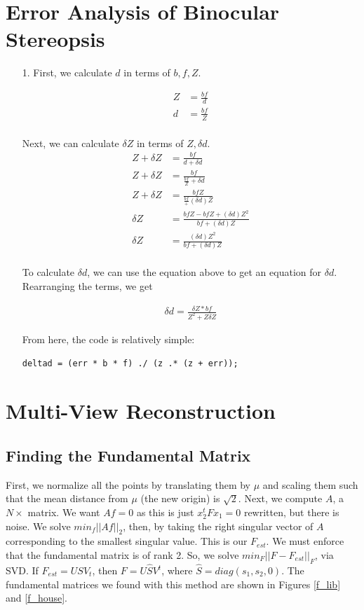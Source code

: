 \documentclass[11pt]{article}
\begin{document}
\newpage
\section{Error Analysis of Binocular Stereopsis}
\begin{enumerate}
\item[1.]
First, we calculate $d$ in terms of $b, f, Z$.

\begin{align*}
Z &= \frac{bf}{d} \\
d &= \frac{bf}{Z} \\
\end{align*}

Next, we can calculate $\delta Z$ in terms of $Z, \delta d$.
\begin{align*}
Z + \delta Z &= \frac{bf}{d + \delta d} \\
Z + \delta Z &= \frac{bf}{\frac{bf}{Z} + \delta d} \\
Z + \delta Z &= \frac{bfZ}{\frac{bf} + (\delta d) Z} \\
\delta Z &= \frac{bfZ - bfZ + (\delta d) Z^2}{bf + (\delta d) Z} \\
\delta Z &= \frac{(\delta d) Z^2}{bf + (\delta d) Z} \\
\end{align*}

To calculate $\delta d$, we can use the equation above to get an equation for
$\delta d$. Rearranging the terms, we get

\begin{align*}
\delta d = \frac{\delta Z * bf}{Z^2 + Z \delta Z}
\end{align*}

From here, the code is relatively simple:
\begin{verbatim}
deltad = (err * b * f) ./ (z .* (z + err));
\end{verbatim}

\end{enumerate}


\newpage
\section{Multi-View Reconstruction}
\subsection{Finding the Fundamental Matrix}
First, we normalize all the points by translating them by $\mu$ and scaling
them such that the mean distance from $\mu$ (the new origin) is $\sqrt{2}$.
Next, we compute $A$, a $N\times$ matrix. We want $Af = 0$ as this is just
$x_2^tFx_1 = 0$ rewritten, but there is noise. We solve $min_f||Af||_2$, then,
by taking the right singular vector of $A$ corresponding to the smallest
singular value. This is our $F_{est}$. We must enforce that the fundamental
matrix is of rank 2. So, we solve $min_F||F-F_{est}||_F$, via SVD. If
$F_{est} = USV_t$, then $F = U\hat{S}V^t$, where $\hat{S} = diag(s_1, s_2, 0)$.
The fundamental matrices we found with this method are shown in Figures
\ref{f_lib} and \ref{f_house}.
\end{document}
